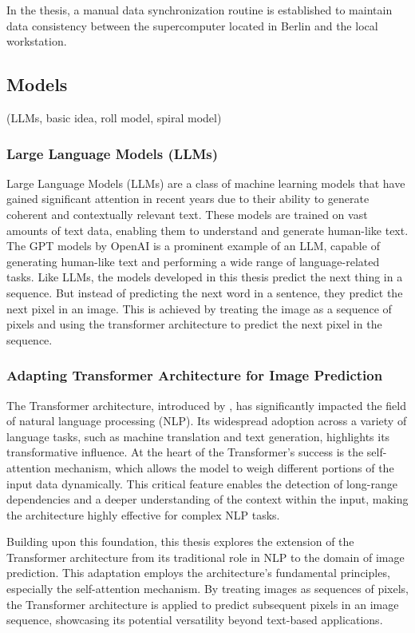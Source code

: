     In the thesis, a manual data synchronization routine is established to maintain data consistency between the supercomputer located in Berlin and the local workstation.

\subsection{Models}
    (LLMs, basic idea, roll model, spiral model)

    \subsubsection{Large Language Models (LLMs)}

    Large Language Models (LLMs) are a class of machine learning models that have gained significant attention in recent years due to their ability to generate coherent and contextually relevant text. These models are trained on vast amounts of text data, enabling them to understand and generate human-like text. The GPT models by OpenAI \autocite{GPT2radford2019} is a prominent example of an LLM, capable of generating human-like text and performing a wide range of language-related tasks. Like LLMs, the models developed in this thesis predict the next thing in a sequence. But instead of predicting the next word in a sentence, they predict the next pixel in an image. This is achieved by treating the image as a sequence of pixels and using the transformer architecture to predict the next pixel in the sequence.

    \subsubsection{Adapting Transformer Architecture for Image Prediction}

    The Transformer architecture, introduced by \autocite{vaswani2023attention}, has significantly impacted the field of natural language processing (NLP). Its widespread adoption across a variety of language tasks, such as machine translation and text generation, highlights its transformative influence. At the heart of the Transformer's success is the self-attention mechanism, which allows the model to weigh different portions of the input data dynamically. This critical feature enables the detection of long-range dependencies and a deeper understanding of the context within the input, making the architecture highly effective for complex NLP tasks.

    Building upon this foundation, this thesis explores the extension of the Transformer architecture from its traditional role in NLP to the domain of image prediction. This adaptation employs the architecture's fundamental principles, especially the self-attention mechanism. By treating images as sequences of pixels, the Transformer architecture is applied to predict subsequent pixels in an image sequence, showcasing its potential versatility beyond text-based applications.
    
